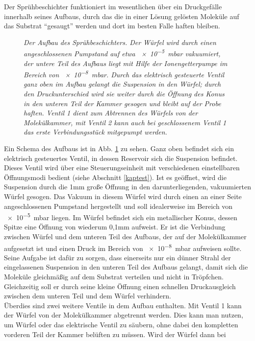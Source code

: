 Der Sprühbeschichter funktioniert im wesentlichen über ein Druckgefälle innerhalb seines Aufbaus, durch das
die in einer Lösung gelösten Moleküle auf das Substrat "`gesaugt"' werden und dort im besten
Falle haften bleiben. 
\begin{figure}
\centering
\sffamily

\caption{\textit{Der Aufbau des Sprühbeschichters.
Der Würfel wird durch einen angeschlossenen Pumpstand auf etwa \SI{e-5}{mbar} vakuumiert, der untere
Teil des Aufbaus liegt mit Hilfe der Ionengetterpumpe im Bereich von \SI{e-8}{mbar}. Durch das
elektrisch gesteuerte Ventil ganz oben im Aufbau gelangt die Suspension in den Würfel; durch den
Druckunterschied wird sie weiter durch die Öffnung des Konus in den unteren Teil der Kammer gesogen
und bleibt auf der Probe haften. Ventil 1 dient zum Abtrennen des Würfels von der Molekülkammer, mit
Ventil 2 kann auch bei geschlossenem Ventil 1 das erste Verbindungsstück mitgepumpt werden.
}}
\label{sbaufbau}
\end{figure}
Ein Schema des Aufbaus ist in Abb. \ref{sbaufbau} zu sehen. Ganz oben befindet sich ein elektrisch
gesteuertes Ventil, in dessen Reservoir sich die Suspension befindet. Dieses Ventil wird über eine
Steuerungseinheit mit verschiedenen einstellbaren Öffnungsmodi bedient (siehe Abschnitt \ref{kaptest}). Ist es
geöffnet, wird die Suspension durch die 1mm große Öffnung in den darunterliegenden, vakuumierten Würfel
gesogen. Das Vakuum in diesem Würfel wird durch einen an einer Seite angeschlossenen Pumpstand hergestellt
und soll idealerweise im Bereich von \SI{e-5}{mbar} liegen. Im Würfel befindet sich ein metallischer
Konus, dessen Spitze eine Öffnung von wiederum 0,1mm aufweist. Er ist die Verbindung zwischen Würfel und dem
unteren Teil des Aufbaus, der auf der Molekülkammer aufgesetzt ist und einen Druck im Bereich von
\SI{e-8}{mbar} aufweisen sollte.  
Seine Aufgabe ist dafür zu sorgen, dass einerseits nur ein dünner Strahl der eingelassenen Suspension in
den unteren Teil des Aufbaus gelangt, damit sich die Moleküle gleichmäßig auf dem Substrat verteilen und
nicht in Tröpfchen. Gleichzeitig soll er durch seine kleine Öffnung einen schnellen Druckausgleich zwischen
dem unteren Teil und dem Würfel verhindern. \\
Überdies sind zwei weitere Ventile in dem Aufbau enthalten. Mit Ventil 1 kann der Würfel von der
Molekülkammer abgetrennt werden. Dies kann man nutzen, um Würfel oder das elektrische Ventil zu säubern, ohne
dabei den kompletten vorderen Teil der Kammer belüften zu müssen. Wird der Würfel dann bei
